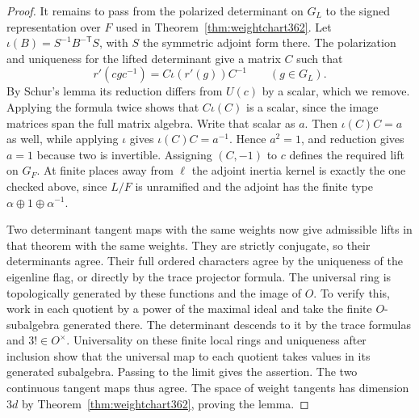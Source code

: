 \documentclass[a4paper,11pt]{article}
\theoremstyle{definition}
\theoremstyle{remark}
\numberwithin{equation}{section}
\begin{document}
\begin{proof}
It remains to pass from the polarized determinant on \(G_L\)
to the signed representation over \(F\) used in
Theorem~\ref{thm:weightchart362}. Let \(\iota(B)=
S^{-1}B^{-\mathsf T}S\), with \(S\) the symmetric adjoint
form there. The polarization and uniqueness for the lifted
determinant give a matrix \(C\) such that
\[
           r'(cgc^{-1})=C\iota(r'(g))C^{-1}\qquad(g\in G_L).
\]
By Schur's lemma its reduction differs from \(U(c)\) by a
scalar, which we remove. Applying the formula twice shows
that \(C\iota(C)\) is a scalar, since the image matrices
span the full matrix algebra. Write that scalar as \(a\).
Then \(\iota(C)C=a\) as well, while applying \(\iota\) gives
\(\iota(C)C=a^{-1}\). Hence \(a^2=1\), and reduction gives
\(a=1\) because two is invertible. Assigning \((C,-1)\)
to \(c\) defines the required lift on \(G_F\). At finite
places away from \(\ell\) the adjoint inertia kernel is
exactly the one checked above, since \(L/F\) is unramified
and the adjoint has the finite type
\(\alpha\oplus1\oplus\alpha^{-1}\).

Two determinant tangent maps with the same weights now
give admissible lifts in that theorem with the same weights.
They are strictly conjugate, so their determinants agree.
Their full ordered characters agree by the uniqueness of
the eigenline flag, or directly by the trace projector
formula. The universal ring is topologically generated by
these functions and the image of \(O\). To verify this, work
in each quotient by a power of the maximal ideal and take
the finite \(O\)-subalgebra generated there. The determinant
descends to it by the trace formulas and \(3!\in O^\times\).
Universality on these finite local rings
and uniqueness after inclusion show that the universal map
to each quotient takes values in its generated subalgebra.
Passing to the limit gives the assertion. The two continuous
tangent maps thus agree. The space of weight tangents has
dimension \(3d\) by Theorem~\ref{thm:weightchart362}, proving
the lemma.
\end{proof}
\end{document}
